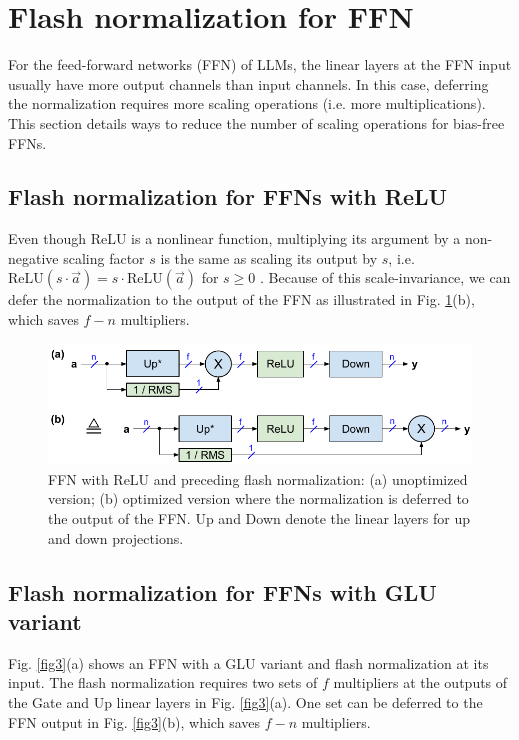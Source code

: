 \documentclass{article}
\numberwithin{equation}{section} %
\def\a{\vec{a}}                       %
\begin{document}
\section{Flash normalization for FFN}
For the feed-forward networks (FFN) of LLMs, the linear layers at the FFN input usually have more output channels than input channels. In this case, deferring the normalization requires more scaling operations (i.e. more multiplications). This section details ways to reduce the number of scaling operations for bias-free FFNs.

\subsection{Flash normalization for FFNs with ReLU}
Even though ReLU is a nonlinear function, multiplying its argument by a non-negative scaling factor $s$ is the same as scaling its output by $s$, i.e. $\text{ReLU}(s \cdot \a) = s \cdot \text{ReLU}(\a)$ for $s \ge 0$ \citep{ReLU}. Because of this scale-invariance, we can defer the normalization to the output of the FFN as illustrated in Fig. \ref{fig2}(b), which saves $f - n$ multipliers.

\begin{figure}[h!] \centering
  \includegraphics[scale=0.9]{../doc/fig/flashNorm_fig2.pdf}
  \caption{FFN with ReLU and preceding flash normalization: (a) unoptimized version; (b) optimized version where the normalization is deferred to the output of the FFN. Up and Down denote the linear layers for up and down projections.}
\label{fig2} \end{figure}

\subsection{Flash normalization for FFNs with GLU variant}
Fig. \ref{fig3}(a) shows an FFN with a GLU variant \citep{GLU} and flash normalization at its input. The flash normalization requires two sets of $f$ multipliers at the outputs of the Gate and Up linear layers in Fig. \ref{fig3}(a). One set can be deferred to the FFN output in Fig. \ref{fig3}(b), which saves $f - n$ multipliers.
\end{document}
